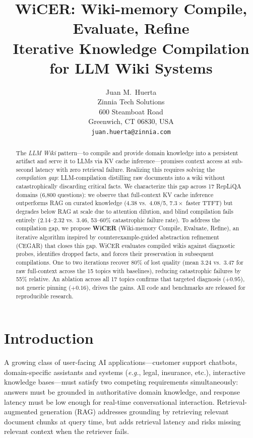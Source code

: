 \documentclass{article}
\title{WiCER: Wiki-memory Compile, Evaluate, Refine\\
Iterative Knowledge Compilation for LLM Wiki Systems}
\author{
   Juan M.~Huerta \\
   Zinnia Tech Solutions \\
   600 Steamboat Road\\
   Greenwich, CT 06830, USA \\
   \texttt{juan.huerta@zinnia.com}
 }
\begin{document}
\maketitle

\begin{abstract}
The \emph{LLM Wiki} pattern---to compile and provide domain knowledge into a persistent
artifact and serve it to LLMs via KV cache inference---promises context access at sub-second
latency with zero retrieval failure. Realizing this requires
solving the \emph{compilation gap}: LLM-compilation distilling raw
documents into a wiki without catastrophically discarding critical facts.
We characterize this gap across 17 RepLiQA domains (6{,}800 questions):
we observe that full-context KV cache inference outperforms RAG on curated knowledge
(4.38 vs.\ 4.08/5, $7.3\times$ faster TTFT) but degrades below RAG at
scale due to attention dilution, and blind compilation fails entirely
(2.14--2.32 vs.\ 3.46, 53--60\% catastrophic failure rate).
To address the compilation gap, we propose \textbf{WiCER} (Wiki-memory Compile, Evaluate, Refine), an
iterative algorithm inspired by counterexample-guided abstraction
refinement (CEGAR) that closes this gap. WiCER evaluates compiled wikis
against diagnostic probes, identifies dropped facts, and forces their
preservation in subsequent compilations. One to two iterations recover
80\% of lost quality (mean 3.24 vs.\ 3.47 for raw full-context
across the 15 topics with baselines), reducing catastrophic failures
by 55\% relative. An ablation across all 17 topics confirms that targeted diagnosis
($+0.95$), not generic pinning ($+0.16$), drives the gains.
All code and benchmarks are released for reproducible research.
\end{abstract}

\section{Introduction}

A growing class of user-facing AI applications---customer support chatbots,
domain-specific assistants and systems (\emph{e.g.}, legal, insurance, etc.), interactive knowledge bases---must satisfy two
competing requirements simultaneously: answers must be grounded in
authoritative domain knowledge, and response
latency must be low enough for real-time conversational interaction.
Retrieval-augmented generation (RAG)
\cite{lewis2020retrieval,gao2024retrievalaugmented} addresses grounding
by retrieving relevant document chunks at query time, but adds retrieval
latency and risks missing relevant context when the retriever fails.
\end{document}
